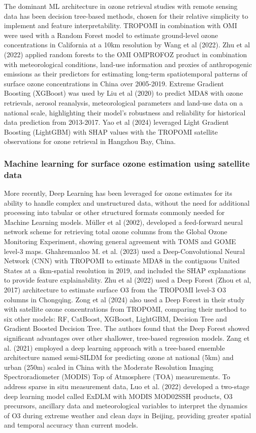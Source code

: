\documentclass[gmd, manuscript]{copernicus}
\begin{document}
The dominant ML architecture in ozone retrieval studies with remote sensing data has been decision tree-based methods, chosen for their relative simplicity to implement and feature interpretability. TROPOMI in combination with OMI were used with a Random Forest model to estimate ground-level ozone concentrations in California at a 10km resolution by Wang et al (2022). Zhu et al (2022) applied random forests to the OMI OMPROFOZ product in combination with meteorological conditions, land-use information and proxies of anthropogenic emissions as their predictors for estimating long-term spatiotemporal patterns of surface ozone concentrations in China over 2005-2019. Extreme Gradient Boosting (XGBoost) was used by Liu et al (2020) to predict MDA8 with ozone retrievals, aerosol reanalysis, meteorological parameters and land-use data on a national scale, highlighting their model’s robustness and reliability for historical data prediction from 2013-2017. Yao et al (2024) leveraged Light Gradient Boosting (LightGBM) with SHAP values with the TROPOMI satellite observations for ozone retrieval in Hangzhou Bay, China.  
\subsubsection{Machine learning for surface ozone estimation using satellite data}
More recently, Deep Learning has been leveraged for ozone estimates for its ability to handle complex and unstructured data, without the need for additional processing into tabular or other structured formats commonly needed for Machine Learning models. Müller et al (2002), developed a feed-forward neural network scheme for retrieving total ozone columns from the Global Ozone Monitoring Experiment, showing general agreement with TOMS and GOME level-3 maps. Ghahremanloo M. et al. (2023) used a Deep-Convolutional Neural Network (CNN) with TROPOMI to estimate MDA8 in the contiguous United States at a 4km-spatial resolution in 2019, and included the SHAP explanations to provide feature explainability. Zhu et al (2022) used a Deep Forest (Zhou et al, 2017) architecture to estimate surface O3 from the TROPOMI level-3 O3 columns in Chongqing.  Zong et al (2024) also used a Deep Forest in their study with satellite ozone concentrations from TROPOMI, comparing their method to six other models: RF, CatBoost, XGBoost, LightGBM, Decision Tree and Gradient Boosted Decision Tree. The authors found that the Deep Forest showed significant advantages over other shallower, tree-based regression models. Zang et al. (2021) employed a deep learning approach with a tree-based ensemble architecture named semi-SILDM for predicting ozone at national (5km) and urban (250m) scaled in China with the Moderate Resolution Imaging Spectroradiometer (MODIS) Top of Atmosphere (TOA) measurements. To address sparse in situ measurement data, Luo et al. (2022) developed a two-stage deep learning model called ExDLM with MODIS MOD02SSH products, O3 precursors, ancillary data and meteorological variables to interpret the dynamics of O3 during extreme weather and clean days in Beijing, providing greater spatial and temporal accuracy than current models. 
\end{document}
